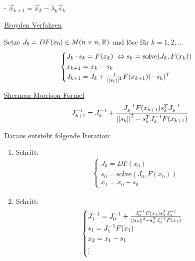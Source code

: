- $\vec{x}_{k+1} = \vec{x}_k - \lambda_k \vec{s}_k$

\vspace{1\baselineskip}

\underline{}

\vspace{1\baselineskip}

\underline{Broyden Verfahren}

Setze $J_0 = DF(x_0) \in M(n \times n , \mathbb{R})$ und löse für $k=1,2,\dots$
\begin{align*}
    \begin{cases}
        J_k \cdot s_k = F(x_k) \ \Leftrightarrow s_k = \text{solve} (J_k , F(x_k))
        \\
        x_{k+1} = x_k - s_k
        \\
        J_{k+1} = J_k + \frac{1}{\left\vert\left\vert s_k \right\vert\right\vert^2} F(x_{k+1}) (-s_k)^T
    \end{cases}
\end{align*}

\vspace{1\baselineskip}

\underline{Sherman-Morrison-Formel}
\begin{align*}
    J_{k+1}^{-1} = J_k^{-1} + \frac{J_k^{-1} F(x_{k+1}) s_k^T J_k^{-1}}{\left\vert\left\vert s_k \right\vert\right\vert^2 - s_k^T J_k^{-1} F(x_{k+1})}
\end{align*}

\vspace{1\baselineskip}

Daraus entsteht folgende \underline{Iteration}:
\begin{enumerate}
    \item Schritt:
        \begin{align*}
            \begin{cases}
                J_0 = DF(x_0) \\
                s_0 = \text{solve} (J_0 , F(x_0)) \\
                x_1 = x_0 - s_0
            \end{cases}
        \end{align*}
    \item Schritt:
        \begin{align*}
            \begin{cases}
                J_1^{-1} = J_0^{-1} + \frac{J_0^{-1} F(x_{1}) s_0^T J_0^{-1}}{\left\vert\left\vert s_0 \right\vert\right\vert^2 - s_0^T J_0^{-1} F(x_{1})}
                \\
                s_1 = J_1^{-1} F(x_1)
                \\
                x_2 = x_1 - s_1
                \\
                \vdots
            \end{cases}
        \end{align*}
\end{enumerate}

